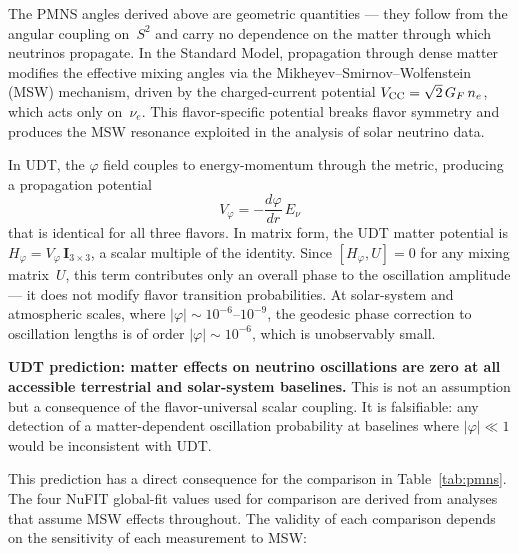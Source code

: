 \documentclass[aps,prd,twocolumn,superscriptaddress,nofootinbib,longbibliography]{revtex4-2}
\begin{document}
The PMNS angles derived above are geometric quantities --- they follow
from the angular coupling on~$S^2$ and carry no dependence on the
matter through which neutrinos propagate.  In the Standard Model,
propagation through dense matter modifies the effective mixing angles
via the Mikheyev--Smirnov--Wolfenstein (MSW) mechanism, driven by the
charged-current potential $V_{\rm CC} = \sqrt{2}\,G_F\,n_e$, which
acts only on~$\nu_e$.  This flavor-specific potential breaks flavor
symmetry and produces the MSW resonance exploited in the analysis of
solar neutrino data.

In UDT, the $\varphi$ field couples to energy-momentum through the
metric, producing a propagation potential
\begin{equation}\label{eq:msw-potential}
  V_\varphi = -\frac{d\varphi}{dr}\,E_\nu
\end{equation}
that is identical for all three flavors.  In matrix form, the UDT
matter potential is $H_\varphi = V_\varphi\,\mathbf{I}_{3\times 3}$,
a scalar multiple of the identity.  Since
$[H_\varphi, U] = 0$ for any mixing matrix~$U$, this term contributes
only an overall phase to the oscillation amplitude --- it does not
modify flavor transition probabilities.  At solar-system and
atmospheric scales, where $|\varphi| \sim 10^{-6}$--$10^{-9}$, the
geodesic phase correction to oscillation lengths is of order
$|\varphi| \sim 10^{-6}$, which is unobservably small.

\textbf{UDT prediction: matter effects on neutrino oscillations are
zero at all accessible terrestrial and solar-system baselines.}  This
is not an assumption but a consequence of the flavor-universal scalar
coupling.  It is falsifiable: any detection of a matter-dependent
oscillation probability at baselines where $|\varphi| \ll 1$ would be
inconsistent with UDT.

This prediction has a direct consequence for the comparison in
Table~\ref{tab:pmns}.  The four NuFIT global-fit values used for
comparison are derived from analyses that assume MSW effects
throughout.  The validity of each comparison depends on the
sensitivity of each measurement to MSW:
\end{document}
